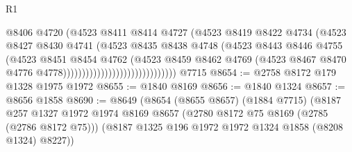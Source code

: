 \begin{lexlean}{R1}
\begin{coremodule}
                                                @8406
                                                @4720
                                                (@4523
                                                  @8411
                                                  @8414
                                                  @4727
                                                  (@4523
                                                    @8419
                                                    @8422
                                                    @4734
                                                    (@4523
                                                      @8427
                                                      @8430
                                                      @4741
                                                      (@4523
                                                        @8435
                                                        @8438
                                                        @4748
                                                        (@4523
                                                          @8443
                                                          @8446
                                                          @4755
                                                          (@4523
                                                            @8451
                                                            @8454
                                                            @4762
                                                            (@4523
                                                              @8459
                                                              @8462
                                                              @4769
                                                              (@4523
                                                                @8467
                                                                @8470
                                                                @4776
                                                                @4778))))))))))))))))))))))))))))))
    @7715
@8654 := @2758 @8172 @179 @1328 @1975 @1972
@8655 := @1840 @8169
@8656 := @1840 @1324
@8657 := @8656 @1858
@8690 := @8649
    (@8654
      (@8655 @8657)
      (@1884 @7715)
      (@8187
        @257
        @1327
        @1972
        @1974
        @8169
        @8657
        (@2780 @8172 @75 @8169 (@2785 (@2786 @8172 @75)))
        (@8187 @1325 @196 @1972 @1972 @1324 @1858 (@8208 @1324) @8227))

\end{coremodule}
\end{lexlean}

